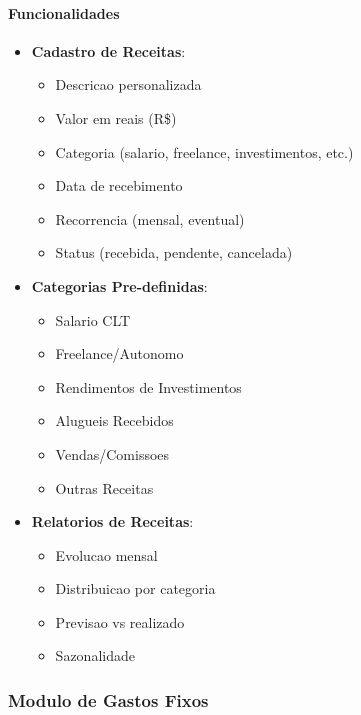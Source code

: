 \paragraph{Funcionalidades}
\begin{itemize}
    \item \textbf{Cadastro de Receitas}:
    \begin{itemize}
        \item Descricao personalizada
        \item Valor em reais (R\$)
        \item Categoria (salario, freelance, investimentos, etc.)
        \item Data de recebimento
        \item Recorrencia (mensal, eventual)
        \item Status (recebida, pendente, cancelada)
    \end{itemize}
    
    \item \textbf{Categorias Pre-definidas}:
    \begin{itemize}
        \item Salario CLT
        \item Freelance/Autonomo
        \item Rendimentos de Investimentos
        \item Alugueis Recebidos
        \item Vendas/Comissoes
        \item Outras Receitas
    \end{itemize}
    
    \item \textbf{Relatorios de Receitas}:
    \begin{itemize}
        \item Evolucao mensal
        \item Distribuicao por categoria
        \item Previsao vs realizado
        \item Sazonalidade
    \end{itemize}
\end{itemize}

\subsubsection{Modulo de Gastos Fixos}

